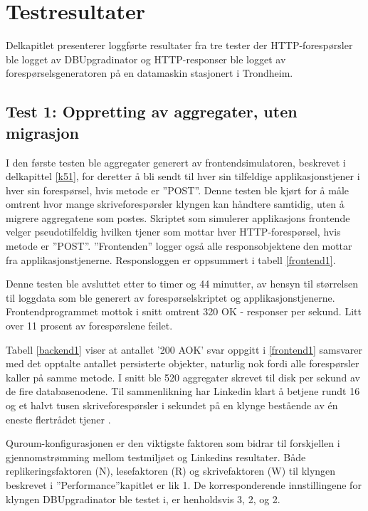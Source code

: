 \section{Testresultater} \label{testing}

Delkapitlet presenterer loggførte resultater fra tre tester der HTTP-forespørsler ble logget av DBUpgradinator og HTTP-responser ble logget av forespørselsgeneratoren på en datamaskin stasjonert i Trondheim.

\subsection{Test 1: Oppretting av aggregater, uten migrasjon}

I den første testen ble aggregater generert av frontendsimulatoren, beskrevet i delkapittel \ref{k51}, for deretter å bli sendt til hver sin tilfeldige applikasjonstjener i hver sin forespørsel, hvis metode er ''POST''. Denne testen ble kjørt for å måle omtrent hvor mange skriveforespørsler klyngen kan håndtere samtidig, uten å migrere aggregatene som postes. Skriptet som simulerer applikasjons frontende velger pseudotilfeldig hvilken tjener som mottar hver HTTP-forespørsel, hvis metode er ''POST''. ''Frontenden'' logger også alle responsobjektene den mottar fra applikasjonstjenerne. Responsloggen er oppsummert i tabell \ref{frontend1}.



Denne testen ble avsluttet etter to timer og 44 minutter, av hensyn til størrelsen til loggdata som ble generert av forespørselskriptet og applikasjonstjenerne. Frontend\-programmet mottok i snitt omtrent 320 OK - responser per sekund. Litt over 11 prosent av forespørslene feilet.



Tabell \ref{backend1} viser at antallet '200 AOK' svar oppgitt i \ref{frontend1} samsvarer med det opptalte antallet persisterte objekter, naturlig nok fordi alle forespørsler kaller på samme metode. I snitt ble 520 aggregater skrevet til disk per sekund av de fire databasenodene. Til sammenlikning har Linkedin klart å betjene rundt 16 og et halvt tusen skriveforespørsler i sekundet på en klynge bestående av én eneste flertrådet tjener \citep{kreps2009}.

Quroum-konfigurasjonen er den viktigste faktoren som bidrar til forskjellen i gjennomstrømming mellom testmiljøet og Linkedins resultater. Både replikeringsfaktoren (N), lesefaktoren (R) og skrivefaktoren (W) til klyngen beskrevet i ''Performance''\-kapitlet er lik 1. De korresponderende innstillingene for klyngen DBUpgradinator ble testet i, er henholdsvis 3, 2, og 2.

